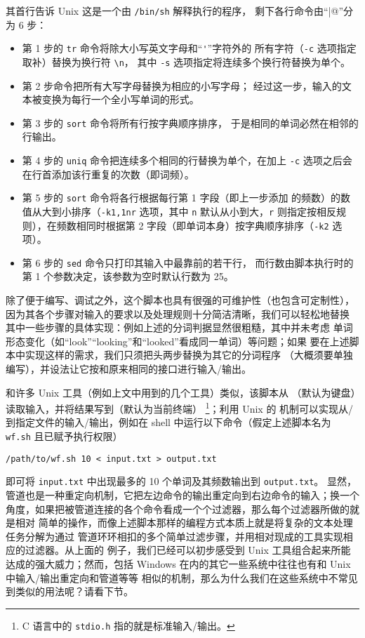 其首行告诉 Unix 这是一个由 \verb|/bin/sh| 解释执行的程序，
剩下各行命令由“\verb@|@”分为 6 步：
\begin{itemize}
\item 第 1 步的 \verb|tr| 命令将除大小写英文字母和“\verb|'|”字符外的
	所有字符（\verb|-c| 选项指定取补）替换为换行符 \verb|\n|，
	其中 \verb|-s| 选项指定将连续多个换行符替换为单个。
\item 第 2 步命令把所有大写字母替换为相应的小写字母；
	经过这一步，输入的文本被变换为每行一个全小写单词的形式。
\item 第 3 步的 \verb|sort| 命令将所有行按字典顺序排序，
	于是相同的单词必然在相邻的行输出。
\item 第 4 步的 \verb|uniq| 命令把连续多个相同的行替换为单个，在加上
	\verb|-c| 选项之后会在行首添加该行重复的次数（即词频）。
\item 第 5 步的 \verb|sort| 命令将各行根据每行第 1 字段（即上一步添加
	的频数）的数值从大到小排序（\verb|-k1,1nr| 选项，其中 \verb|n|
	默认从小到大，\verb|r| 则指定按相反规则），在频数相同时根据第
	2 字段（即单词本身）按字典顺序排序（\verb|-k2| 选项）。
\item 第 6 步的 \verb|sed| 命令只打印其输入中最靠前的若干行，
	而行数由脚本执行时的第 1 个参数决定，该参数为空时默认行数为 25。
\end{itemize}
除了便于编写、调试之外，这个脚本也具有很强的可维护性（也包含可定制性），
因为其各个步骤对输入的要求以及处理规则十分简洁清晰，我们可以轻松地替换
其中一些步骤的具体实现：例如上述的分词判据显然很粗糙，其中并未考虑
单词形态变化（如“look”“looking”和“looked”看成同一单词）等问题；如果
要在上述脚本中实现这样的需求，我们只须把头两步替换为其它的分词程序
（大概须要单独编写），并设法让它按和原来相同的接口进行输入/输出。

和许多 Unix 工具（例如上文中用到的几个工具）类似，该脚本从%
（默认为键盘）读取输入，并将结果写到（默认为当前终端）%
\footnote{C 语言中的 \texttt{stdio.h} 指的就是标准输入/输出。}；利用 Unix 的%
机制可以实现从/到指定文件的输入/输出，例如在 shell
中运行以下命令（假定上述脚本名为 \verb|wf.sh| 且已赋予执行权限）
\begin{quoting}
\begin{Verbatim}
/path/to/wf.sh 10 < input.txt > output.txt
\end{Verbatim}
\end{quoting}
即可将 \verb|input.txt| 中出现最多的 10 个单词及其频数输出到 \verb|output.txt|。
显然，管道也是一种重定向机制，它把左边命令的输出重定向到右边命令的输入；换一个
角度，如果把被管道连接的各个命令看成一个个过滤器，那么每个过滤器所做的就是相对
简单的操作，而像上述脚本那样的编程方式本质上就是将复杂的文本处理任务分解为通过
管道环环相扣的多个简单过滤步骤，并用相对现成的工具实现相应的过滤器。从上面的
例子，我们已经可以初步感受到 Unix 工具组合起来所能达成的强大威力；然而，包括
Windows 在内的其它一些系统中往往也有和 Unix 中输入/输出重定向和管道等等
相似的机制，那么为什么我们在这些系统中不常见到类似的用法呢？请看下节。

